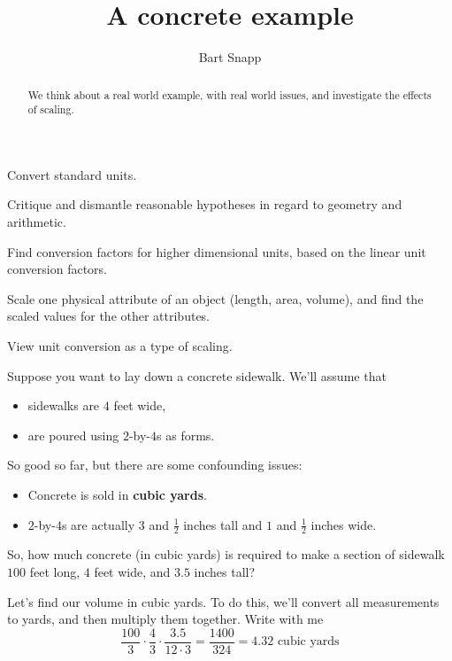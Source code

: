 \documentclass[handout,nooutcomes,noauthor]{ximera}
\title{A concrete example}
\author{Bart Snapp}
\begin{document}
\begin{abstract}
  We think about a real world example, with real world issues, and
  investigate the effects of scaling.
\end{abstract}
\maketitle


\begin{listOutcomes}
\item Convert standard units.
\item Critique and dismantle reasonable hypotheses in regard to
  geometry and arithmetic.
\item Find conversion factors for higher dimensional units, based on
  the linear unit conversion factors.
\item Scale one physical attribute of an object (length, area,
  volume), and find the scaled values for the other attributes.
\item View unit conversion as a type of scaling.
\end{listOutcomes}



\mynewpage



\begin{question}
  Suppose you want to lay down a concrete sidewalk. We'll assume that
  \begin{itemize}
  \item sidewalks are $4$ feet wide,
  \item are poured using $2$-by-$4$s as forms.
  \end{itemize}
  So good so far, but there are some confounding issues:
  \begin{itemize}
  \item Concrete is sold in \textbf{cubic yards}.
  \item $2$-by-$4$s are actually $3$ and $\frac{1}{2}$ inches tall and
    $1$ and $\frac{1}{2}$ inches wide.
  \end{itemize}
  So, how much concrete (in cubic yards) is required to make a section
  of sidewalk $100$ feet long, $4$ feet wide, and $3.5$ inches tall?
  \begin{freeResponse}
    Let's find our volume in cubic yards. To do this, we'll convert
    all measurements to yards, and then multiply them together. Write with me
    \[
    \frac{100}{3} \cdot \frac{4}{3}\cdot \frac{3.5}{12\cdot 3} = \frac{1400}{324} = 4.32 \text{ cubic yards}
    \] 
  \end{freeResponse}
\end{question}
\mynewpage
\end{document}
